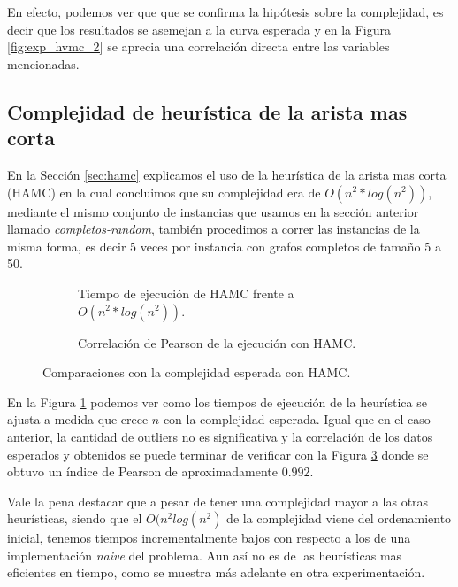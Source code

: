 \documentclass[10pt,a4paper]{article}
\begin{document}
En efecto, podemos ver que que se confirma la hipótesis sobre la complejidad, es decir que los resultados se asemejan a la curva esperada y en la Figura \ref{fig:exp_hvmc_2} se aprecia una correlación directa entre las variables mencionadas. 
\newline

\subsection{Complejidad de heurística de la arista mas corta} \label{sec:exp-hamc-complejidad}

En la Sección \ref{sec:hamc} explicamos el uso de la heurística de la arista mas corta (HAMC) en la cual concluimos que su complejidad era de $O(n^2*log(n^2))$, mediante el mismo conjunto de instancias que usamos en la sección anterior llamado \emph{completos-random}, también procedimos a correr las instancias de la misma forma, es decir 5 veces por instancia con grafos completos de tamaño 5 a 50.
\begin{figure}[h!]
    \centering
    \captionsetup{justification=centering}
    \begin{subfigure}{0.45\linewidth}
        \centering
        
        \caption{Tiempo de ejecución de HAMC frente a $O(n^2*log(n^2))$.}
        \label{fig:exp_hamc_1}
    \end{subfigure}
    \begin{subfigure}{0.45\linewidth}
        \centering
        
        \caption{Correlación de Pearson de la ejecución con HAMC.}
        \label{fig:exp_hamc_2}
    \end{subfigure}
    \caption{Comparaciones con la complejidad esperada con HAMC.}
\end{figure}

En la Figura \ref{fig:exp_hamc_1} podemos ver como los tiempos de ejecución de la heurística se ajusta a medida que crece $n$ con la complejidad esperada. 
Igual que en el caso anterior, la cantidad de outliers no es significativa y la correlación de los datos esperados y obtenidos se puede terminar de verificar con la Figura \ref{fig:exp_hamc_2} donde se obtuvo un índice de Pearson de aproximadamente $0.992$.

Vale la pena destacar que a pesar de tener una complejidad mayor a las otras heurísticas, siendo que el $O(n^2log(n^2)$ de la complejidad viene del ordenamiento inicial, tenemos tiempos incrementalmente bajos con respecto a los de una implementación \emph{naive} del problema.
Aun así no es de las heurísticas mas eficientes en tiempo, como se muestra más adelante en otra experimentación.
\end{document}
